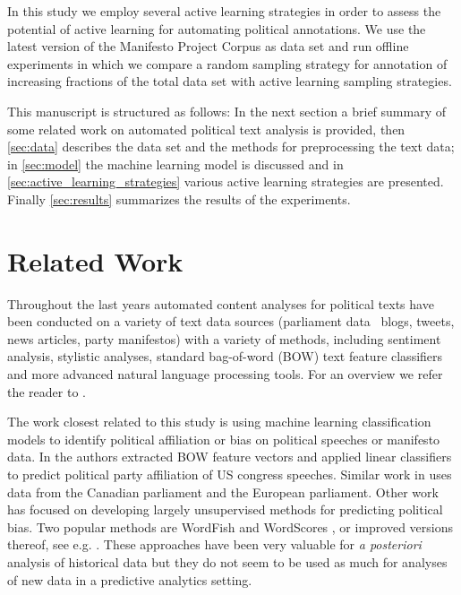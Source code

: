 \documentclass[runningheads,a4paper]{article}
\begin{document}
In this study we employ several active learning strategies in order to assess the potential of active learning for automating political annotations. We use the latest version of the Manifesto Project Corpus as data set and run offline experiments in which we compare a random sampling strategy for annotation of increasing fractions of the total data set with active learning sampling strategies. 

This manuscript is structured as follows: In the next section a brief summary of some related work on automated political text analysis is provided, then \autoref{sec:data} describes the data set and the methods for preprocessing the text data; in \autoref{sec:model} the machine learning model is discussed and in \autoref{sec:active_learning_strategies} various active learning strategies are presented. Finally \autoref{sec:results} summarizes the results of the experiments. 

\section{Related Work}\label{sec:related}

Throughout the last years automated content analyses for political texts have been conducted on a variety of text data sources (parliament data \, blogs, tweets, news articles, party manifestos) with a variety of methods, including sentiment analysis, stylistic analyses, standard bag-of-word (BOW) text feature classifiers and more advanced natural language processing tools. For an overview we refer the reader to \cite{Grimmer2013,Kaal2014}. 

The work closest related to this study is using machine learning classification models to identify political affiliation or bias on political speeches or manifesto data. In \cite{Yu2008} the authors extracted BOW feature vectors and applied linear classifiers to predict political party affiliation of US congress speeches. Similar work in \cite{Hirst2014} uses data from the Canadian parliament and the European parliament. 
Other work has focused on developing largely unsupervised methods for predicting political bias. Two popular methods are WordFish \cite{Slapin08ascaling} and WordScores \cite{Laver2003}, or improved versions thereof, see e.g. \cite{Lowe09scalingpolicy}. These approaches have been very valuable for {\em a posteriori} analysis of historical data but they do not seem to be used as much for analyses of new data in a predictive analytics setting. 
\end{document}

